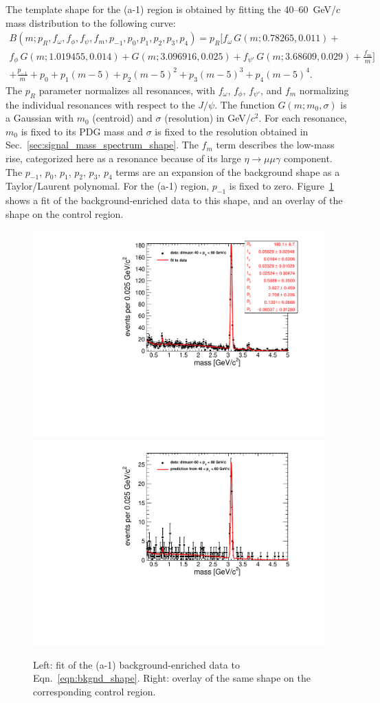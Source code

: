 \documentclass[12pt]{cms-tdr}
\begin{document}
The template shape for the (a-1) region is obtained by fitting the
40--60~GeV/$c$ mass distribution to the following curve:
\begin{multline}
B(m; p_R, f_\omega, f_\phi, f_\psi, f_m, p_{-1}, p_0, p_1, p_2, p_3, p_4) = 
p_R \bigg[f_\omega \, G(m; 0.78265, 0.011) + \\ f_\phi \, G(m; 1.019455, 0.014) + G(m; 3.096916, 0.025) + f_{\psi'} \, G(m; 3.68609, 0.029) + \frac{f_m}{m} \bigg] \\
+ \frac{p_{-1}}{m} + p_0 + p_1 (m - 5) + p_2 (m - 5)^2 + p_3 (m - 5)^3 + p_4 (m - 5)^4.
\label{eqn:bkgnd_shape}
\end{multline}
The $p_R$ parameter normalizes all resonances, with $f_\omega$,
$f_\phi$, $f_{\psi'}$, and $f_m$ normalizing the individual resonances
with respect to the $J/\psi$.  The function $G(m; m_0, \sigma)$ is a
Gaussian with $m_0$ (centroid) and $\sigma$ (resolution) in GeV/$c^2$.
For each resonance, $m_0$ is fixed to its PDG mass and $\sigma$ is
fixed to the resolution obtained in
Sec.~\ref{sec:signal_mass_spectrum_shape}.  The $f_m$ term describes
the low-mass rise, categorized here as a resonance because of its
large $\eta \to \mu\mu\gamma$ component.  The $p_{-1}$, $p_0$, $p_1$,
$p_2$, $p_3$, $p_4$ terms are an expansion of the background shape as
a Taylor/Laurent polynomal.  For the (a-1) region, $p_{-1}$ is fixed
to zero.  Figure~\ref{fig:backgroundEnriched_highpt} shows a fit of
the background-enriched data to this shape, and an overlay of the
shape on the control region.

\begin{figure}
\includegraphics[width=0.5\linewidth]{PLOTS/fullscale-backgroundEnriched_highpt.pdf}
\includegraphics[width=0.5\linewidth]{PLOTS/fullscale-control_highpt.pdf}

\caption{Left: fit of the (a-1) background-enriched data to
  Eqn.~\ref{eqn:bkgnd_shape}.  Right: overlay of the same shape on the
  corresponding control region. \label{fig:backgroundEnriched_highpt}}
\end{figure}
\end{document}
